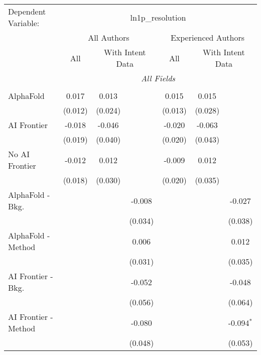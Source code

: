 \begingroup
\centering
\begin{tabular}{lcccccc}
   \tabularnewline \midrule \midrule
   Dependent Variable: & \multicolumn{6}{c}{ln1p\_resolution}\\
 & \multicolumn{3}{c}{All Authors} & \multicolumn{3}{c}{Experienced Authors} \\
\cmidrule(lr){2-4} \cmidrule(lr){5-7}
 & \multicolumn{1}{c}{All} & \multicolumn{2}{c}{With Intent Data} & \multicolumn{1}{c}{All} & \multicolumn{2}{c}{With Intent Data} \\
\cmidrule(lr){2-2} \cmidrule(lr){3-4} \cmidrule(lr){5-5} \cmidrule(lr){6-7}
 & \multicolumn{6}{c}{\textit{All Fields}} \\ \\
   AlphaFold               & 0.017   & 0.013   &              & 0.015   & 0.015   &   \\   
                           & (0.012) & (0.024) &              & (0.013) & (0.028) &   \\   
   AI Frontier             & -0.018  & -0.046  &              & -0.020  & -0.063  &   \\   
                           & (0.019) & (0.040) &              & (0.020) & (0.043) &   \\   
   No AI Frontier          & -0.012  & 0.012   &              & -0.009  & 0.012   &   \\   
                           & (0.018) & (0.030) &              & (0.020) & (0.035) &   \\   
   AlphaFold - Bkg.        &         &         & -0.008       &         &         & -0.027\\   
                           &         &         & (0.034)      &         &         & (0.038)\\   
   AlphaFold - Method      &         &         & 0.006        &         &         & 0.012\\   
                           &         &         & (0.031)      &         &         & (0.035)\\   
   AI Frontier - Bkg.      &         &         & -0.052       &         &         & -0.048\\   
                           &         &         & (0.056)      &         &         & (0.064)\\   
   AI Frontier - Method    &         &         & -0.080       &         &         & -0.094$^{*}$\\   
                           &         &         & (0.048)      &         &         & (0.053)\\   

\end{tabular}
